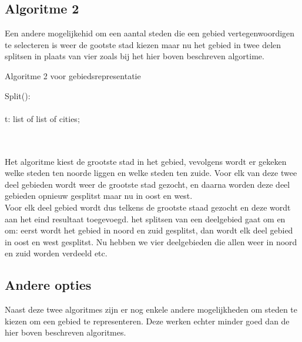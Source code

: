 \documentclass[twoside,openright]{uva-bachelor-thesis}
\begin{document}
		\subsection{Algoritme 2}
			Een andere mogelijkehid om een aantal steden die een gebied vertegenwoordigen te selecteren is weer de gootste stad kiezen maar nu het gebied in twee delen splitsen in plaats van vier zoals bij het hier boven beschreven algortime.
			\begin{algorithm}
				\caption{Algoritme 2 voor gebiedsrepresentatie}
				\mbox{Split():}\\[0.5cm]
				\mbox{}\\
				t: list of list of cities;\\
				\mbox{}\\
			\end{algorithm}\\[0.5cm]
			Het algoritme kiest de grootste stad in het gebied, vevolgens wordt er gekeken welke steden ten noorde liggen en welke steden ten zuide. Voor elk van deze twee deel gebieden wordt weer de grootste stad gezocht, en daarna worden deze deel gebieden opnieuw gesplitst maar nu in oost en west.\\[0.5cm]
			Voor elk deel gebied wordt dus telkens de grootste staad gezocht en deze wordt aan het eind resultaat toegevoegd. het splitsen van een deelgebied gaat om en om: eerst wordt het gebied in noord en zuid gesplitst, dan wordt elk deel gebied in oost en west gesplitst. Nu hebben we vier deelgebieden die allen weer in noord en zuid worden verdeeld etc.
		\subsection{Andere opties}
			Naast deze twee algoritmes zijn er nog enkele andere mogelijkheden om steden te kiezen om een gebied te representeren. Deze werken echter minder goed dan de hier boven beschreven algoritmes.
\end{document}
